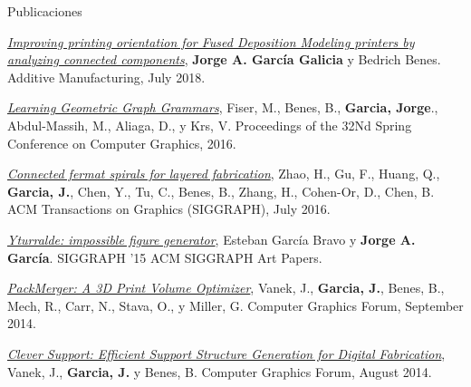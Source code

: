 \documentclass{resume} %
\begin{document}
\begin{rSection}{Publicaciones} \itemsep -4pt
\item \textit{\href{http://www.sciencedirect.com/science/article/pii/S2214860417302555}{Improving printing orientation for Fused Deposition Modeling printers by analyzing connected components}}, { \bf Jorge A. García Galicia} y Bedrich Benes. Additive Manufacturing, July 2018.
\item \textit{\href{http://dl.acm.org/doi/abs/10.1145/2948628.2948635}{Learning Geometric Graph Grammars}}, Fiser, M., Benes, B., { \bf Garcia, Jorge}., Abdul-Massih, M., Aliaga, D., y Krs, V. Proceedings of the 32Nd Spring Conference on Computer Graphics, 2016.
\item \textit{\href{http://dl.acm.org/doi/abs/10.1145/2897824.2925958}{Connected fermat spirals for layered fabrication}}, Zhao, H., Gu, F., Huang, Q., { \bf Garcia, J.}, Chen, Y., Tu, C., Benes, B., Zhang, H., Cohen-Or, D., Chen, B. ACM Transactions on Graphics (SIGGRAPH), July 2016.
\item \textit{\href{http://www.mitpressjournals.org/doi/abs/10.1162/LEON_a_01090}{Yturralde: impossible figure generator}}, Esteban García Bravo y { \bf Jorge A. García}. SIGGRAPH '15 ACM SIGGRAPH Art Papers.
\item \textit{\href{http://onlinelibrary.wiley.com/doi/abs/10.1111/cgf.12353}{PackMerger: A 3D Print Volume Optimizer}}, Vanek, J., { \bf Garcia, J.}, Benes, B., Mech, R., Carr, N., Stava, O., y Miller, G. Computer Graphics Forum, September 2014.
\item \textit{\href{http://onlinelibrary.wiley.com/doi/abs/10.1111/cgf.12437}{Clever Support: Efficient Support Structure Generation for Digital Fabrication}}, Vanek, J., { \bf Garcia, J.} y Benes, B. Computer Graphics Forum, August 2014.
\end{rSection}

\end{document}
